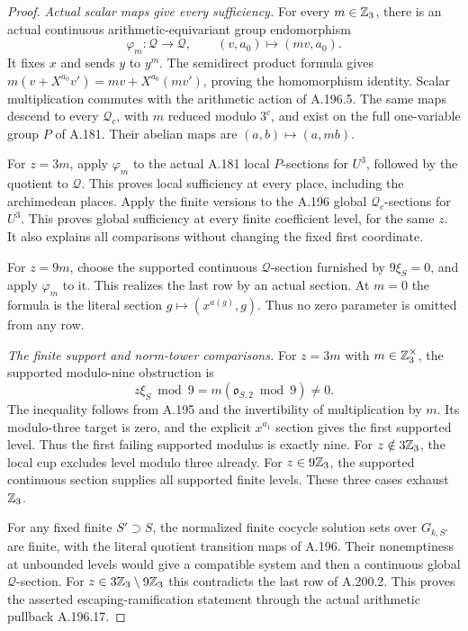 \begin{proof}
\emph{Actual scalar maps give every sufficiency.}
For every \(m\in\mathbb Z_3\), there is an actual continuous
arithmetic-equivariant group endomorphism
\[
 \varphi_m:\mathcal Q\longrightarrow\mathcal Q,\qquad
                (v,a_0)\longmapsto(mv,a_0).
\tag{A.200.9}
\]
It fixes \(x\) and sends \(y\) to \(y^m\).
The semidirect product formula gives
\(m(v+X^{a_0}v')=mv+X^{a_0}(mv')\), proving the
homomorphism identity.  Scalar multiplication
commutes with the arithmetic action of A.196.5.
The same maps descend to every \(\mathcal Q_c\),
with \(m\) reduced modulo \(3^c\), and exist on the
full one-variable group \(P\) of A.181.
Their abelian maps are
\((a,b)\mapsto(a,mb)\).

For \(z=3m\), apply \(\varphi_m\) to the actual
A.181 local \(P\)-sections for \(U^3\), followed by
the quotient to \(\mathcal Q\).  This proves local
sufficiency at every place, including the
archimedean places.  Apply the finite versions to
the A.196 global \(\mathcal Q_c\)-sections for
\(U^3\).  This proves global sufficiency at every
finite coefficient level, for the same \(z\).
It also explains all comparisons without changing
the fixed first coordinate.

For \(z=9m\), choose the supported continuous
\(\mathcal Q\)-section furnished by
\(9\xi_S=0\), and apply \(\varphi_m\) to it.
This realizes the last row by an actual section.
At \(m=0\) the formula is the literal section
\(g\mapsto(x^{a(g)},g)\).  Thus no zero parameter
is omitted from any row.

\emph{The finite support and norm-tower comparisons.}
For \(z=3m\) with \(m\in\mathbb Z_3^\times\), the supported
modulo-nine obstruction is
\[
             z\xi_S\bmod9
                =m(\mathfrak o_{S,2}\bmod9)\ne0.
\tag{A.200.10}
\]
The inequality follows from A.195 and the invertibility
of multiplication by \(m\).  Its modulo-three target
is zero, and the explicit \(x^{a_1}\) section gives
the first supported level.  Thus the first failing
supported modulus is exactly nine.
For \(z\notin3\mathbb Z_3\), the local cup excludes level
modulo three already.  For \(z\in9\mathbb Z_3\), the supported
continuous section supplies all supported finite
levels.  These three cases exhaust \(\mathbb Z_3\).

For any fixed finite \(S'\supset S\), the normalized
finite cocycle solution sets over \(G_{k,S'}\) are
finite, with the literal quotient transition maps
of A.196.  Their nonemptiness at unbounded levels
would give a compatible system and then a continuous
global \(\mathcal Q\)-section.  For
\(z\in3\mathbb Z_3\setminus9\mathbb Z_3\) this contradicts the
last row of A.200.2.  This proves the asserted
escaping-ramification statement through the actual
arithmetic pullback A.196.17.


\end{proof}

